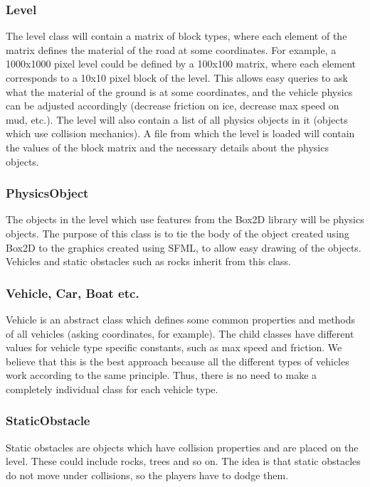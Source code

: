 \documentclass{article}
\begin{document}
\subsubsection*{Level}
The level class will contain a matrix of block types, where each element of the matrix defines the material of the road at some coordinates. For example, a 1000x1000 pixel level could be defined by a 100x100 matrix, where each element corresponds to a 10x10 pixel block of the level. This allows easy queries to ask what the material of the ground is at some coordinates, and the vehicle physics can be adjusted accordingly (decrease friction on ice, decrease max speed on mud, etc.). The level will also contain a list of all physics objects in it (objects which use collision mechanics). A file from which the level is loaded will contain the values of the block matrix and the necessary details about the physics objects.

\subsubsection*{PhysicsObject}
The objects in the level which use features from the Box2D library will be physics objects. The purpose of this class is to tie the body of the object created using Box2D to the graphics created using SFML, to allow easy drawing of the objects. Vehicles and static obstacles such as rocks inherit from this class.

\subsubsection*{Vehicle, Car, Boat etc.}
Vehicle is an abstract class which defines some common properties and methods of all vehicles (asking coordinates, for example). The child classes have different values for vehicle type specific constants, such as max speed and friction. We believe that this is the best approach because all the different types of vehicles work according to the same principle. Thus, there is no need to make a completely individual class for each vehicle type.

\subsubsection*{StaticObstacle}
Static obstacles are objects which have collision properties and are placed on the level. These could include rocks, trees and so on. The idea is that static obstacles do not move under collisions, so the players have to dodge them.
\end{document}
